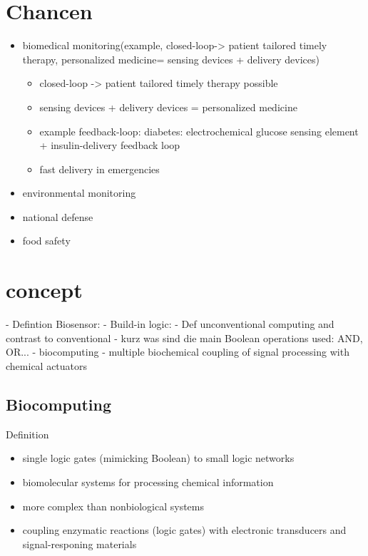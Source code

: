 \documentclass[runningheads]{llncs}
\begin{document}
\section{Chancen}
\begin{itemize}
	\item biomedical monitoring(example, closed-loop-> patient tailored timely therapy, personalized medicine= sensing devices + delivery devices)
	\begin{itemize}
		\item closed-loop -> patient tailored timely therapy possible
		\item sensing devices + delivery devices = personalized medicine
		\item example feedback-loop: diabetes: electrochemical glucose sensing element + insulin-delivery feedback loop
		\item fast delivery in emergencies 
	\end{itemize}
	\item environmental monitoring
	\item national defense
	\item food safety
	\\
	\end{itemize}





\section{concept}
	- Defintion Biosensor:
	- Build-in logic:
	- Def unconventional computing and contrast to conventional
	- kurz was sind die main Boolean operations used: AND, OR...
	- biocomputing 
	- multiple biochemical coupling of signal processing with chemical actuators

\subsection{Biocomputing}
	Definition
	\begin{itemize}
		\item single logic gates (mimicking Boolean) to small logic networks
		\item biomolecular systems for processing chemical information
		\item more complex than nonbiological systems 
		\item coupling enzymatic reactions (logic gates) with electronic transducers and signal-responing materials 
	\end{itemize}
\end{document}
